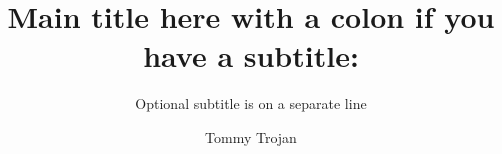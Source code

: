 \documentclass[12pt]{report}
\begin{document}
\title{Main title here with a colon if you have a subtitle:}
\subtitle{Optional subtitle is on a separate line}

\author{Tommy Trojan}




\begin{preface}

  \newpage
  \thispagestyle{plain}


  {
  \tableofcontents
  \listoftables
  \listoffigures
  }

  

  

  
\end{preface}

\clearpage


\graphicspath{}



\clearpage


\clearpage


\clearpage



\graphicspath{}

\end{document}
